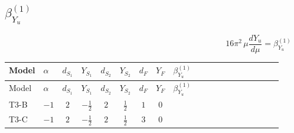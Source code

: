 \documentclass{article}
\begin{document}
\begin{landscape}
\section*{$\beta_{Y_u}^{(1)}$}
\[16\pi^2\,\mu\frac{d Y_u}{d\mu}=\beta_{Y_u}^{(1)}\]
\tiny
\begin{longtable}{@{}llcccccc >{\raggedright\arraybackslash}p{0.54\linewidth}@{}}
\toprule
Model & $\alpha$ & $d_{S_1}$ & $Y_{S_1}$ & $d_{S_2}$ & $Y_{S_2}$ & $d_F$ & $Y_F$ & $\beta_{Y_u}^{(1)}$ \\
\midrule
\endfirsthead
\toprule
Model & $\alpha$ & $d_{S_1}$ & $Y_{S_1}$ & $d_{S_2}$ & $Y_{S_2}$ & $d_F$ & $Y_F$ & $\beta_{Y_u}^{(1)}$ \\
\midrule
\endhead
T3-B & $-1$ & $2$ & $-\frac{1}{2}$ & $2$ & $\frac{1}{2}$ & $1$ & $0$ & \scriptsize\adjustbox{max width=\linewidth}{$\begin{gathered} 3 \operatorname{Tr}\!\left({Y_d}\,\left({Y_d}\right)^{\dagger}\right) \left({Y_u}\right)_{ij} \\ +\operatorname{Tr}\!\left({Y_e}\,\left({Y_e}\right)^{\dagger}\right) \left({Y_u}\right)_{ij} \\ +3 \operatorname{Tr}\!\left({Y_u}\,\left({Y_u}\right)^{\dagger}\right) \left({Y_u}\right)_{ij} \\ -\frac{3}{2} (\left({Y_d}\,\left({Y_d}\right)^{\dagger}\,{Y_u}\right)_{ij}-\left({Y_u}\,\left({Y_u}\right)^{\dagger}\,{Y_u}\right)_{ij}) \\ -\frac{9}{4} {g_2}^2 \left({Y_u}\right)_{ij} \\ -8 {g_3}^2 \left({Y_u}\right)_{ij} \\ -\frac{17}{12} {g_Y}^2 \left({Y_u}\right)_{ij}\end{gathered}$} \\
\midrule
T3-C & $-1$ & $2$ & $-\frac{1}{2}$ & $2$ & $\frac{1}{2}$ & $3$ & $0$ & \scriptsize\adjustbox{max width=\linewidth}{$\begin{gathered} 3 \operatorname{Tr}\!\left({Y_d}\,\left({Y_d}\right)^{\dagger}\right) \left({Y_u}\right)_{ij} \\ +\operatorname{Tr}\!\left({Y_e}\,\left({Y_e}\right)^{\dagger}\right) \left({Y_u}\right)_{ij} \\ +3 \operatorname{Tr}\!\left({Y_u}\,\left({Y_u}\right)^{\dagger}\right) \left({Y_u}\right)_{ij} \\ -\frac{3}{2} (\left({Y_d}\,\left({Y_d}\right)^{\dagger}\,{Y_u}\right)_{ij}-\left({Y_u}\,\left({Y_u}\right)^{\dagger}\,{Y_u}\right)_{ij}) \\ -\frac{9}{4} {g_2}^2 \left({Y_u}\right)_{ij} \\ -8 {g_3}^2 \left({Y_u}\right)_{ij} \\ -\frac{17}{12} {g_Y}^2 \left({Y_u}\right)_{ij}\end{gathered}$} \\

\end{longtable}
\end{landscape}
\end{document}
